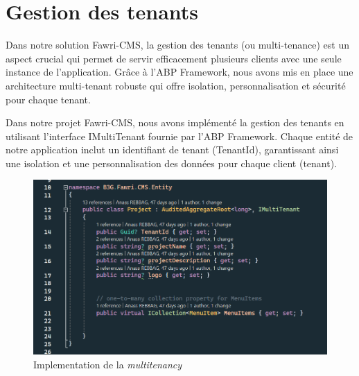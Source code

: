 \section{Gestion des tenants}

\hspace{\parindent}Dans notre solution Fawri-CMS, la gestion des tenants (ou multi-tenance) est un aspect crucial qui permet de servir efficacement plusieurs clients avec une seule instance de l'application. Grâce à l'ABP Framework, nous avons mis en place une architecture multi-tenant robuste qui offre isolation, personnalisation et sécurité pour chaque tenant.

Dans notre projet Fawri-CMS, nous avons implémenté la gestion des tenants en utilisant l'interface IMultiTenant fournie par l'ABP Framework. Chaque entité de notre application inclut un identifiant de tenant (TenantId), garantissant ainsi une isolation et une personnalisation des données pour chaque client (tenant).


\begin{figure}[H]
    \centering
    \includegraphics[width=13cm]{Figures/tenant code.PNG}
    \caption{Implementation de la \textit{multitenancy}}
\end{figure}



